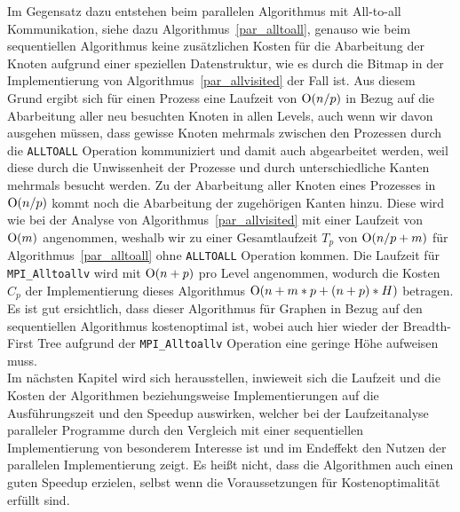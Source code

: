 \documentclass[11pt,a4paper]{article}
\begin{document}
Im Gegensatz dazu entstehen beim parallelen Algorithmus mit All-to-all Kommunikation, siehe dazu Algorithmus~\ref{par_alltoall}, genauso wie beim sequentiellen Algorithmus keine zusätzlichen Kosten für die Abarbeitung der Knoten aufgrund einer speziellen Datenstruktur, wie es durch die Bitmap in der Implementierung von Algorithmus~\ref{par_allvisited} der Fall ist. Aus diesem Grund ergibt sich für einen Prozess eine Laufzeit von \($O$(n/p)\) in Bezug auf die Abarbeitung aller neu besuchten Knoten in allen Levels, auch wenn wir davon ausgehen müssen, dass gewisse Knoten mehrmals zwischen den Prozessen durch die \lstinline{ALLTOALL} Operation kommuniziert und damit auch abgearbeitet werden, weil diese durch die Unwissenheit der Prozesse und durch unterschiedliche Kanten mehrmals besucht werden. Zu der Abarbeitung aller Knoten eines Prozesses in \($O$(n/p)\) kommt noch die Abarbeitung der zugehörigen Kanten hinzu. Diese wird wie bei der Analyse von Algorithmus~\ref{par_allvisited} mit einer Laufzeit von \($O$(m)\) angenommen, weshalb wir zu einer Gesamtlaufzeit \(T_{p}\) von \($O$(n/p + m)\) für Algorithmus~\ref{par_alltoall} ohne \lstinline{ALLTOALL} Operation kommen. Die Laufzeit für \lstinline{MPI_Alltoallv} wird mit \($O$(n+p)\) pro Level angenommen, wodurch die Kosten \(C_{p}\) der Implementierung dieses Algorithmus \($O$(n + m*p + (n+p)*H)\) betragen. Es ist gut ersichtlich, dass dieser Algorithmus für Graphen in Bezug auf den sequentiellen Algorithmus kostenoptimal ist, wobei auch hier wieder der Breadth-First Tree aufgrund der \lstinline{MPI_Alltoallv} Operation eine geringe Höhe aufweisen muss.\\
Im nächsten Kapitel wird sich herausstellen, inwieweit sich die Laufzeit und die Kosten der Algorithmen beziehungsweise Implementierungen auf die Ausführungszeit und den Speedup auswirken, welcher bei der Laufzeitanalyse paralleler Programme durch den Vergleich mit einer sequentiellen Implementierung von besonderem Interesse ist und im Endeffekt den Nutzen der parallelen Implementierung zeigt. Es heißt nicht, dass die Algorithmen auch einen guten Speedup erzielen, selbst wenn die Voraussetzungen für Kostenoptimalität erfüllt sind.
\end{document}

